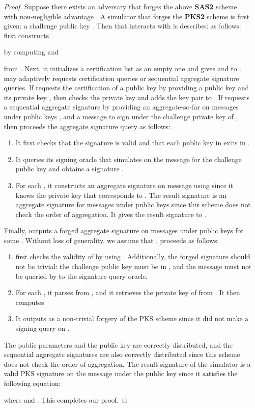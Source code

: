 \documentclass[11pt,letterpaper]{article}
\newcommand{\tb}[1]{\textbf{#1}}
\begin{document}
\begin{proof}
Suppose there exists an adversary  that forges the above \tb{SAS2}
scheme with non-negligible advantage . A simulator  that
forges the \tb{PKS2} scheme is first given: a challenge public key
    .
Then  that interacts with  is described as follows:
 first constructs
    
by computing  and
    
from . Next, it initializes a certification list  as an empty
one and gives  and  to .
 may adaptively requests certification queries or sequential
aggregate signature queries. If  requests the certification of a
public key by providing a public key  and its private key , then 
checks the private key and adds the key pair  to .
If  requests a sequential aggregate signature by providing an
aggregate-so-far  on messages  under
public keys , and a message  to
sign under the challenge private key of , then  proceeds the
aggregate signature query as follows:
\begin{enumerate}
\item It first checks that the signature  is valid and that each
    public key in  exits in .

\item It queries its signing oracle that simulates  on
    the message  for the challenge public key  and obtains a
    signature .

\item For each , it constructs an aggregate signature on
    message  using  since it knows the private
    key that corresponds to . The result signature is an aggregate
    signature for messages  under public keys  since this scheme does not check the order of aggregation.
    It gives the result signature  to .
\end{enumerate}
Finally,  outputs a forged aggregate signature  on messages  under
public keys  for some . Without loss
of generality, we assume that .  proceeds as follows:
\begin{enumerate}
\item  first checks the validity of  by using
    . Additionally, the forged signature should not
    be trivial: the challenge public key  must be in ,
    and the message  must not be queried by  to the
    signature query oracle.

\item For each , it parses  from , and it retrieves the private
    key  of  from . It then
    computes
    

\item It outputs  as a non-trivial
    forgery of the PKS scheme since it did not make a signing query on
    .
\end{enumerate}

The public parameters and the public key are correctly distributed, and the
sequential aggregate signatures are also correctly distributed since this
scheme does not check the order of aggregation. The result signature  of the simulator is a valid PKS signature on
the message  under the public key  since it satisfies the
following equation:
    
where  and . This completes our proof.
\end{proof}
\end{document}
